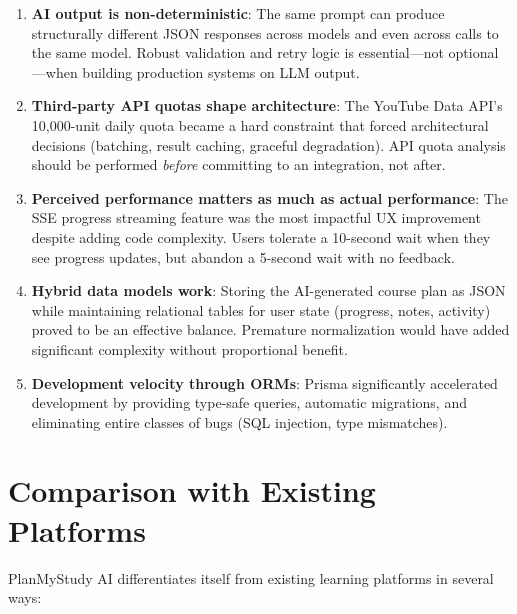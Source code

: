 \documentclass[12pt,a4paper]{report}
\begin{document}
\begin{enumerate}
    \item \textbf{AI output is non-deterministic}: The same prompt can produce structurally different JSON responses across models and even across calls to the same model. Robust validation and retry logic is essential---not optional---when building production systems on LLM output.
    \item \textbf{Third-party API quotas shape architecture}: The YouTube Data API's 10{,}000-unit daily quota became a hard constraint that forced architectural decisions (batching, result caching, graceful degradation). API quota analysis should be performed \emph{before} committing to an integration, not after.
    \item \textbf{Perceived performance matters as much as actual performance}: The SSE progress streaming feature was the most impactful UX improvement despite adding code complexity. Users tolerate a 10-second wait when they see progress updates, but abandon a 5-second wait with no feedback.
    \item \textbf{Hybrid data models work}: Storing the AI-generated course plan as JSON while maintaining relational tables for user state (progress, notes, activity) proved to be an effective balance. Premature normalization would have added significant complexity without proportional benefit.
    \item \textbf{Development velocity through ORMs}: Prisma significantly accelerated development by providing type-safe queries, automatic migrations, and eliminating entire classes of bugs (SQL injection, type mismatches).
\end{enumerate}

\section{Comparison with Existing Platforms}
PlanMyStudy AI differentiates itself from existing learning platforms in several ways:
\end{document}
